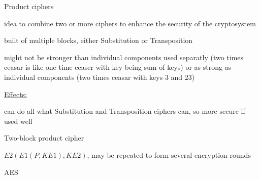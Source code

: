 \documentclass[landscape, a4paper]{article}
\begin{document}
\begin{minipage}[t]{0.198\pagewidth}
	\begin{betterlist}
		\item \alert{Product ciphers}
		\begin{betterlist}
			\item idea to combine two or more ciphers to enhance the security of the cryptosystem
			\begin{betterlist}
				\item built of multiple blocks, either \alert{Substitution} or \alert{Transposition}
			\end{betterlist}
			\item might not be stronger than individual components used separatly (two times ceasar is like one time ceaser with key being sum of keys) or as strong as individual components (two times ceasar with keys $3$ and $23$)
			\item \underline{Effects:}
			\begin{betterlist}
				\item can do all what Substitution and Transposition ciphers can, so more secure if used well
			\end{betterlist}
			\item \alert{Two-block product cipher}
			\begin{betterlist}
				\item $E2(E1(P, KE1), KE2)$, may be repeated to form several encryption rounds
			\end{betterlist}
			\item \alert{AES}
		\end{betterlist}
	\end{betterlist}
\end{minipage}
\end{document}
